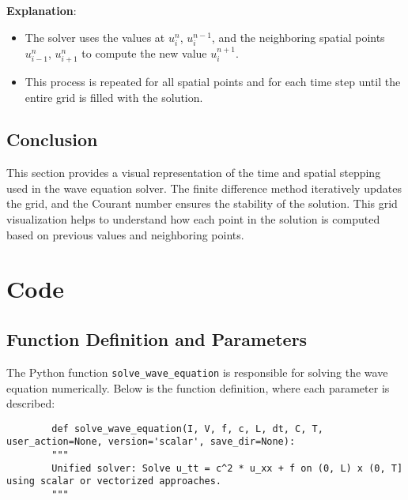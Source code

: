 \documentclass[a4paper, 11pt]{article}
\begin{document}
	\textbf{Explanation}:
	\begin{itemize}
		\item The solver uses the values at $u_i^n$, $u_i^{n-1}$, and the neighboring spatial points $u_{i-1}^n$, $u_{i+1}^n$ to compute the new value $u_i^{n+1}$.
		\item This process is repeated for all spatial points and for each time step until the entire grid is filled with the solution.
	\end{itemize}
	
	\subsection{Conclusion}
	
	This section provides a visual representation of the time and spatial stepping used in the wave equation solver. The finite difference method iteratively updates the grid, and the Courant number ensures the stability of the solution. This grid visualization helps to understand how each point in the solution is computed based on previous values and neighboring points.
	
	\section{Code}
	\subsection{Function Definition and Parameters}
	
	The Python function \texttt{solve\_wave\_equation} is responsible for solving the wave equation numerically. Below is the function definition, where each parameter is described:
	
	\lstset{language=Python}
	\begin{lstlisting}
		def solve_wave_equation(I, V, f, c, L, dt, C, T, user_action=None, version='scalar', save_dir=None):
		"""
		Unified solver: Solve u_tt = c^2 * u_xx + f on (0, L) x (0, T] using scalar or vectorized approaches.
		"""
	\end{lstlisting}
	
\end{document}
